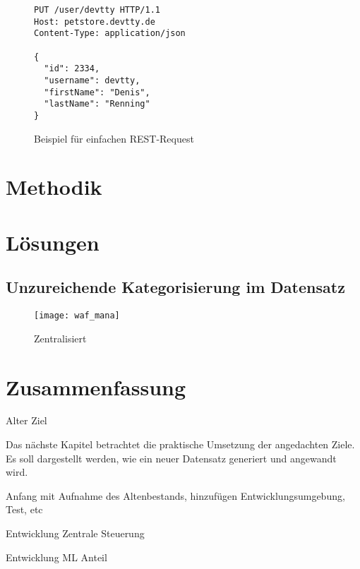       \begin{figure}
        \caption{Beispiel für einfachen REST-Request}
        \label{fig:restputexample}
      \begin{lstlisting}
PUT /user/devtty HTTP/1.1
Host: petstore.devtty.de
Content-Type: application/json

{
  "id": 2334,
  "username": devtty,
  "firstName": "Denis",
  "lastName": "Renning"
}
\end{lstlisting}
\end{figure}



\section{Methodik}


\section{Lösungen}

\subsection{Unzureichende Kategorisierung im Datensatz}


\begin{figure}[ht]
  \begin{center}
    \texttt{[image: waf\_mana]}
    \caption{Zentralisiert~\cite{Manaseer2018}}
    \label{fig.topten}
  \end{center}
\end{figure}




\section{Zusammenfassung}

Alter
Ziel

Das nächste Kapitel betrachtet die praktische Umsetzung der angedachten Ziele. Es soll dargestellt werden, wie ein neuer Datensatz generiert und angewandt wird. 

\begin{neu}
  Anfang mit Aufnahme des Altenbestands, hinzufügen Entwicklungsumgebung, Test, etc

  Entwicklung Zentrale Steuerung

  Entwicklung ML Anteil
\end{neu}